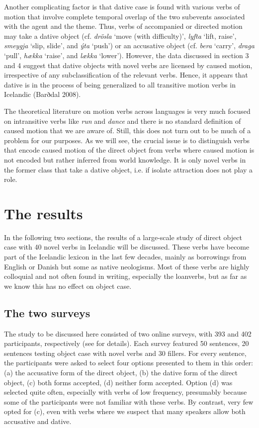 \documentclass[output=paper,modfonts,nonflat]{langsci/langscibook}
\begin{document}
Another complicating factor is that dative case is found with various verbs of motion that involve complete temporal overlap of the two subevents associated with the agent and the theme. Thus, verbs of accompanied or directed motion may take a dative object (cf. \textit{drösla} ‘move (with difficulty)’, \textit{lyfta} ‘lift, raise’, \textit{smeygja} ‘slip, slide’, and \textit{ýta} ‘push’) or an accusative object (cf. \textit{bera} ‘carry’, \textit{draga} ‘pull’, \textit{hækka} ‘raise’, and \textit{lækka} ‘lower’). However, the data discussed in section 3 and 4 suggest that dative objects with novel verbs are licensed by caused motion, irrespective of any subclassification of the relevant verbs. Hence, it appears that dative is in the process of being generalized to all transitive motion verbs in Icelandic (Barðdal 2008).

The theoretical literature on motion verbs across languages is very much focused on intransitive verbs like \textit{run} and \textit{dance} and there is no standard definition of caused motion that we are aware of. Still, this does not turn out to be much of a problem for our purposes. As we will see, the crucial issue is to distinguish verbs that encode caused motion of the direct object from verbs where caused motion is not encoded but rather inferred from world knowledge. It is only novel verbs in the former class that take a dative object, i.e. if isolate attraction does not play a role.

\section{The results} %

In the following two sections, the results of a large-scale study of direct object case with 40 novel verbs in Icelandic will be discussed. These verbs have become part of the Icelandic lexicon in the last few decades, mainly as borrowings from English or Danish but some as native neologisms. Most of these verbs are highly colloquial and not often found in writing, especially the loanverbs, but as far as we know this has no effect on object case. 

\subsection{The two surveys} %

The study to be discussed here consisted of two online surveys, with 393 and 402 participants, respectively (see \citealt{Thórarinsdóttir2015} for details). Each survey featured 50 sentences, 20 sentences testing object case with novel verbs and 30 fillers. For every sentence, the participants were asked to select four options presented to them in this order: (a) the accusative form of the direct object, (b) the dative form of the direct object, (c) both forms accepted, (d) neither form accepted. Option (d) was selected quite often, especially with verbs of low frequency, presumably because some of the participants were not familiar with these verbs. By contrast, very few opted for (c), even with verbs where we suspect that many speakers allow both accusative and dative.
\end{document}
